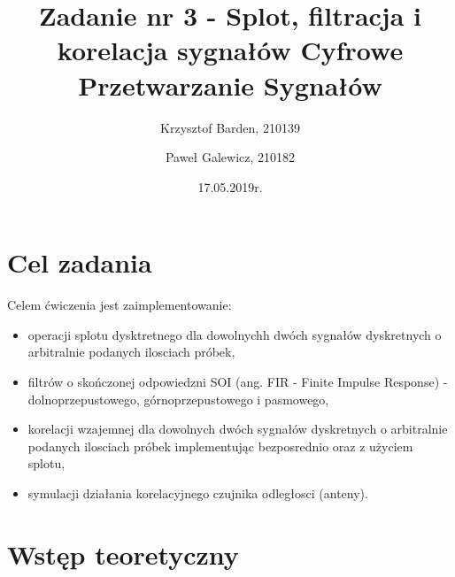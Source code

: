 \documentclass[12pt]{article}
\title{{\bf Zadanie nr 3 - Splot, filtracja i korelacja sygnałów}\linebreak
Cyfrowe Przetwarzanie Sygnałów}
\author{Krzysztof Barden, 210139 \and Paweł Galewicz, 210182}
\date{17.05.2019r.}
\begin{document}
\clearpage\maketitle
\thispagestyle{empty}
\newpage
\setcounter{page}{1}
\section{Cel zadania}

Celem ćwiczenia jest zaimplementowanie:
\begin{itemize}
\item operacji splotu dysktretnego dla dowolnychh dwóch sygnałów dyskretnych o arbitralnie podanych ilosciach próbek,
\item filtrów o skończonej odpowiedzni SOI (ang. FIR - Finite Impulse Response) - dolnoprzepustowego, górnoprzepustowego i pasmowego,
\item korelacji wzajemnej dla dowolnych dwóch sygnałów dyskretnych o arbitralnie podanych ilosciach próbek implementując bezposrednio oraz z użyciem splotu,
\item symulacji działania korelacyjnego czujnika odległosci (anteny).
\end{itemize}

\section{Wstęp teoretyczny}
\end{document}

